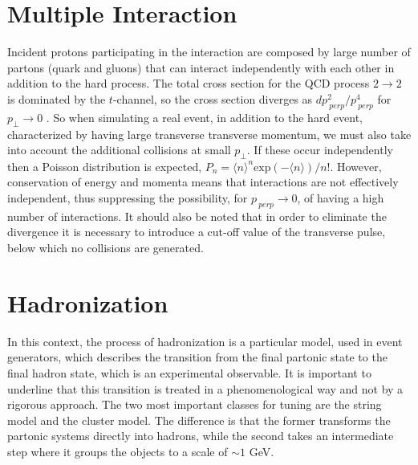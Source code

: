 \section{Multiple Interaction}
Incident protons participating in the interaction are composed by  large number of partons (quark and gluons) that can interact independently with each other in addition to the hard process.
The total cross section for the QCD process $ 2 \rightarrow2 $ is dominated by the $t$-channel, so the cross section diverges as $ d p _ {\ perp} ^ 2 / p _ {\ perp} ^ 4 $ for $ p _ {\perp} \rightarrow 0 $ \cite{Sjostrand: 2006su}.
So when simulating a real event, in addition to the hard event, characterized by having large transverse transverse momentum, we must also take into account the additional collisions at small $ p _{\perp} $. If these occur independently then a Poisson distribution is expected, $ P_n = \langle n \rangle ^ n \mbox {exp} (- \langle n \rangle) / n! $. However, conservation of energy and momenta means that interactions are not effectively independent, thus suppressing the possibility, for $ p_{\ perp} \rightarrow 0 $, of having a high number of interactions.
It should also be noted that in order to eliminate the divergence it is necessary to introduce a cut-off value of the transverse pulse, below which no collisions are generated.



\section{Hadronization }
In this context, the process of hadronization is a particular model, used in event generators, which describes the transition from the final partonic state to the final hadron state, which is an  experimental observable. It is important to underline that this transition is treated in a phenomenological way and not by a rigorous approach. The two most important classes for tuning are the string model and the cluster model. The difference is that the former transforms the partonic systems directly into hadrons, while the second takes an intermediate step where it groups the objects to a scale of $ \sim 1 $ GeV.

